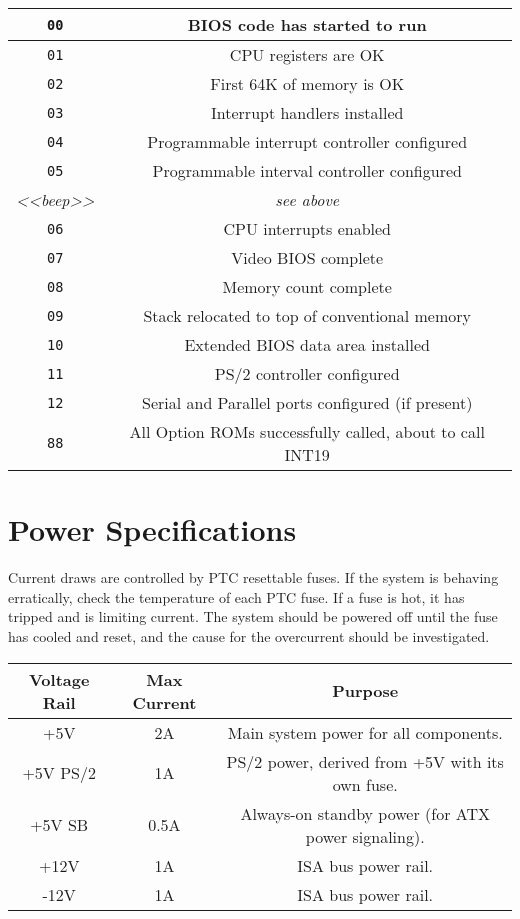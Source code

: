 \documentclass[twoside,10pt,letterpaper]{refart}
\begin{document}
\begin{center}
\begin{tabular}{ c|c }
 \texttt{00} & BIOS code has started to run \\\hline
 \texttt{01} & CPU registers are OK \\\hline
 \texttt{02} & First 64K of memory is OK \\\hline
 \texttt{03} & Interrupt handlers installed \\\hline
 \texttt{04} & Programmable interrupt controller configured \\\hline
 \texttt{05} & Programmable interval controller configured \\\hline
 \emph{<<beep>>} & \emph{see above} \\\hline
 \texttt{06} & CPU interrupts enabled \\\hline
 \texttt{07} & Video BIOS complete \\\hline
 \texttt{08} & Memory count complete \\\hline
 \texttt{09} & Stack relocated to top of conventional memory \\\hline
 \texttt{10} & Extended BIOS data area installed \\\hline
 \texttt{11} & PS/2 controller configured \\\hline
 \texttt{12} & Serial and Parallel ports configured (if present) \\\hline
 \texttt{88} & All Option ROMs successfully called, about to call INT19 \\
\end{tabular}
\end{center}

\section{Power Specifications}

Current draws are controlled by PTC resettable fuses. If the system is behaving erratically,
check the temperature of each PTC fuse. If a fuse is hot, it has tripped and is limiting current.
The system should be powered off until the fuse has cooled and reset, and the cause for the overcurrent
should be investigated.

\begin{center}
\begin{tabular}{ c|c|c  }
 \hline
 \textbf{Voltage Rail}   & \textbf{Max Current}    & \textbf{Purpose} \\
 \hline
 +5V & 2A & Main system power for all components. \\
 +5V PS/2 & 1A & PS/2 power, derived from +5V with its own fuse. \\
 +5V SB & 0.5A & Always-on standby power (for ATX power signaling). \\
 +12V & 1A & ISA bus power rail. \\
 -12V & 1A & ISA bus power rail. \\
\end{tabular}
\end{center}
\end{document}
